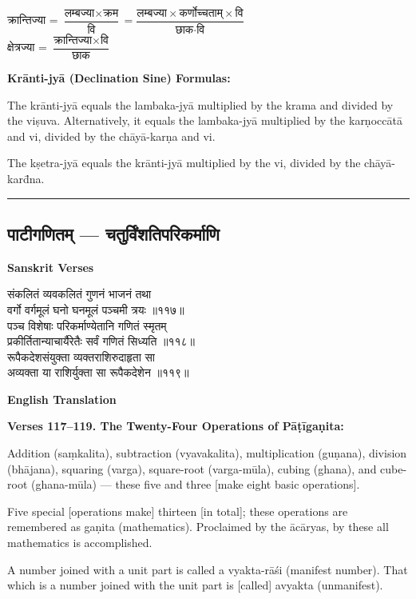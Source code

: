 \documentclass[11pt,a4paper]{article}
\newcommand{\longline}{\noindent\rule{\textwidth}{0.4pt}}
\newcommand{\dev}[1]{{\devanagarifont #1}}
\newcommand{\sectsep}{\par\vspace{0.8em}\longline\vspace{0.8em}}
\begin{document}
\begin{minipage}[t]{0.48\textwidth}
\small\devanagarifont
क्रान्तिज्या = $\dfrac{\text{लम्बज्या} \times \text{क्रम}}{\text{वि}} = \dfrac{\text{लम्बज्या} \times \text{कर्णोच्चताम्} \times \text{वि}}{\text{छाक} \cdot \text{वि}}$\\[0.8em]
क्षेत्रज्या = $\dfrac{\text{क्रान्तिज्या} \times \text{वि}}{\text{छाक}}$
\end{minipage}%
\hfill
\begin{minipage}[t]{0.48\textwidth}
\small
\textbf{Kr\=anti-jy\=a (Declination Sine) Formulas:}

The kr\=anti-jy\=a equals the lambaka-jy\=a multiplied by the krama and divided by the vi\d{s}uva. Alternatively, it equals the lambaka-jy\=a multiplied by the kar\d{n}occ\=at\=a and vi, divided by the ch\=ay\=a-kar\d{n}a and vi.

The k\d{s}etra-jy\=a equals the kr\=anti-jy\=a multiplied by the vi, divided by the ch\=ay\=a-kar\=d{n}a.
\end{minipage}

\sectsep

\subsection{\dev{पाटीगणितम् --- चतुर्विंशतिपरिकर्माणि}}
\label{subsec:patiganita}

\begin{minipage}[t]{0.48\textwidth}
\textbf{\small Sanskrit Verses}

\small\devanagarifont
संकलितं व्यवकलितं गुणनं भाजनं तथा\\
वर्गो वर्गमूलं घनो घनमूलं पञ्चमी त्रयः ॥११७॥\\[0.5em]
पञ्च विशेषाः परिकर्माण्येतानि गणितं स्मृतम्\\
प्रकीर्तितान्याचार्यैरेतैः सर्वं गणितं सिध्यति ॥११८॥\\[0.5em]
रूपैकदेशसंयुक्ता व्यक्तराशिरुदाहृता सा\\
अव्यक्ता या राशिर्युक्ता सा रूपैकदेशेन ॥११९॥
\end{minipage}%
\hfill
\begin{minipage}[t]{0.48\textwidth}
\textbf{\small English Translation}

\textbf{Verses 117--119. The Twenty-Four Operations of P\=a\d{t}\=iga\d{n}ita:}

Addition (sa\d{m}kalita), subtraction (vyavakalita), multiplication (gu\d{n}ana), division (bh\=ajana), squaring (varga), square-root (varga-m\=ula), cubing (ghana), and cube-root (ghana-m\=ula) --- these five and three [make eight basic operations].

Five special [operations make] thirteen [in total]; these operations are remembered as ga\d{n}ita (mathematics). Proclaimed by the \=ac\=aryas, by these all mathematics is accomplished.

A number joined with a unit part is called a vyakta-r\=a\'si (manifest number). That which is a number joined with the unit part is [called] avyakta (unmanifest).
\end{minipage}
\end{document}
